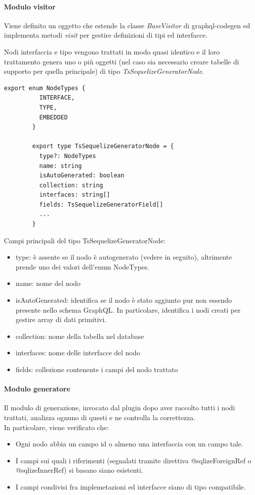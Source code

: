\documentclass[a4paper, 12pt]{scrartcl}
\begin{document}
      \paragraph*{Modulo visitor}
      Viene definito un oggetto che estende la classe \emph{BaseVisitor} di graphql-codegen ed implementa metodi \emph{visit} per gestire definizioni di tipi ed interfacce.

      Nodi interfaccia e tipo vengono trattati in modo quasi identico e il loro trattamento genera uno o più oggetti (nel caso sia necessario creare tabelle di supporto per quella principale) di tipo \emph{TsSequelizeGeneratorNode}.
      \begin{Verbatim}[samepage=true]
        export enum NodeTypes {
          INTERFACE,
          TYPE,
          EMBEDDED
        }

        export type TsSequelizeGeneratorNode = {
          type?: NodeTypes
          name: string
          isAutoGenerated: boolean
          collection: string
          interfaces: string[]
          fields: TsSequelizeGeneratorField[]
          ...
        }       
      \end{Verbatim}
      Campi principali del tipo TsSequelizeGeneratorNode:
      \begin{itemize}
        \item type: è assente se il nodo è autogenerato (vedere in seguito), altrimente prende uno dei valori dell'enum NodeTypes.
        \item name: nome del nodo
        \item isAutoGenerated: identifica se il nodo è stato aggiunto pur non essendo presente nello schema GraphQL. In particolare, identifica i nodi creati per gestire array di dati primitivi.
        \item collection: nome della tabella nel database
        \item interfaces: nome delle interfacce del nodo
        \item fields: collezione contenente i campi del nodo trattato
      \end{itemize}
      \newpage

      \paragraph*{Modulo generatore}
      Il modulo di generazione, invocato dal plugin dopo aver raccolto tutti i nodi trattati, analizza ognuno di questi e ne controlla la correttezza.\\
      In particolare, viene verificato che:
      \begin{itemize}
        \item Ogni nodo abbia un campo id o almeno una interfaccia con un campo tale.
        \item I campi sui quali i riferimenti (segnalati tramite direttiva @sqlizeForeignRef o @sqlizeInnerRef) si basano siano esistenti.
        \item I campi condivisi fra implemetazioni ed interfacce siano di tipo compatibile.
      \end{itemize}
\end{document}
